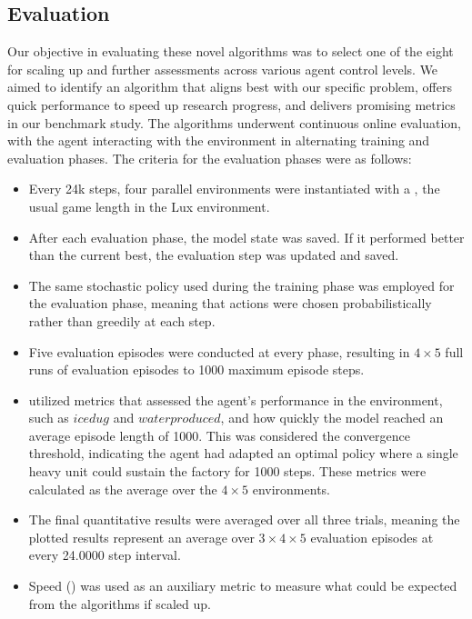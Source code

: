 
\subsection{Evaluation}
\label{sec:single-unit-eval}

\noindent Our objective in evaluating these novel algorithms was to select one of the eight for scaling up and further assessments across various agent control levels. We aimed to identify an algorithm that aligns best with our specific problem, offers quick performance to speed up research progress, and delivers promising metrics in our benchmark study. The algorithms underwent continuous online evaluation, with the agent interacting with the environment in alternating training and evaluation phases. The criteria for the evaluation phases were as follows:

\begin{itemize}[itemsep=1pt, parsep=0pt]
    \item Every 24k steps, four parallel environments were instantiated with a , the usual game length in the Lux environment.
    
    \item After each evaluation phase, the model state was saved. If it performed better than the current best, the evaluation step was updated and saved.
    
    \item The same stochastic policy used during the training phase was employed for the evaluation phase, meaning that actions were chosen probabilistically rather than greedily at each step.
    
    \item Five evaluation episodes were conducted at every phase, resulting in $4 \times 5$ full runs of evaluation episodes to 1000 maximum episode steps.
    
    \item {} utilized metrics that assessed the agent's performance in the environment, such as $ice dug$ and $water produced$, and how quickly the model reached an average episode length of 1000. This was considered the convergence threshold, indicating the agent had adapted an optimal policy where a single heavy unit could sustain the factory for 1000 steps. These metrics were calculated as the average over the $4 \times 5$ environments.
    
    \item The final quantitative results were averaged over all three trials, meaning the plotted results represent an average over $3 \times 4 \times 5$ evaluation episodes at every 24.0000 step interval.
    
    \item Speed () was used as an auxiliary metric to measure what could be expected from the algorithms if scaled up.
\end{itemize}

